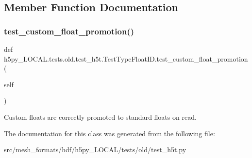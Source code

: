 \subsection{Member Function Documentation}
\mbox{\label{classh5py__LOCAL_1_1tests_1_1old_1_1test__h5t_1_1TestTypeFloatID_a0818382aeb86a84fccbb1e62fb4d4352}} 
\subsubsection{\texorpdfstring{test\+\_\+custom\+\_\+float\+\_\+promotion()}{test\_custom\_float\_promotion()}}
{\footnotesize\ttfamily def h5py\+\_\+\+L\+O\+C\+A\+L.\+tests.\+old.\+test\+\_\+h5t.\+Test\+Type\+Float\+I\+D.\+test\+\_\+custom\+\_\+float\+\_\+promotion (\begin{DoxyParamCaption}\item[{}]{self }\end{DoxyParamCaption})}

\begin{DoxyVerb}Custom floats are correctly promoted to standard floats on read.\end{DoxyVerb}
 

The documentation for this class was generated from the following file\+:\begin{DoxyCompactItemize}
\item 
src/mesh\+\_\+formats/hdf/h5py\+\_\+\+L\+O\+C\+A\+L/tests/old/test\+\_\+h5t.\+py\end{DoxyCompactItemize}
